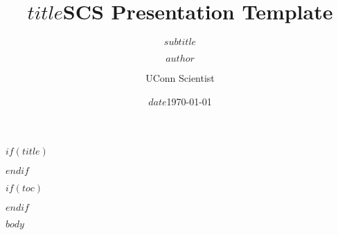 \documentclass[]{beamer}
\title{$title$}
\title{SCS Presentation Template}
\subtitle{$subtitle$}
\author{$author$}
\author{UConn Scientist}
\date{$date$}
\date{\today}
\begin{document}
$if(title)$
  \begin{frame}%
  \titlepage
  \end{frame}
$endif$


$if(toc)$
  \begin{frame}
  \tableofcontents[hideallsubsections]
  \end{frame}
$endif$

$body$
\end{document}

